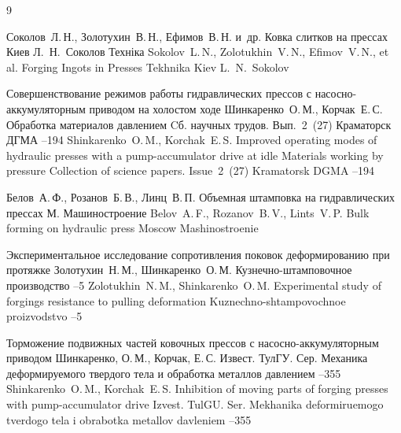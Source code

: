 \begin{thebibliography}{9}

\by Соколов~Л.\,Н., Золотухин~В.\,Н., Ефимов~В.\,Н. и~др.
\book Ковка слитков на прессах
\publaddr Киев
\ed Л.~Н.~Соколов
\publ Техніка
\misctransl 
\by Sokolov~L.\,N., Zolotukhin~V.\,N., Efimov~V.\,N., et al.
\book Forging Ingots in Presses 
\publ Tekhnika
\publaddr Kiev 
\ed L.~N.~Sokolov

\paper Совершенствование режимов работы гидравлических прессов с насосно-аккумуляторным приводом на холостом ходе
\by Шинкаренко~О.\,М., Корчак~Е.\,С.
\inbook Обработка материалов давлением
\bookinfo Cб. научных трудов. Вып.~2~(27)
\publaddr Краматорск
\publ ДГМА
--194
\misctransl
\by Shinkarenko~O.\,M., Korchak~E.\,S.
\paper Improved operating modes of hydraulic presses with a pump-accumulator drive at idle 
\inbook Materials working by pressure
\bookinfo Collection of science papers. Issue~2~(27)
\publaddr Kramatorsk 
\publ DGMA
--194



\by Белов~А.\,Ф., Розанов~Б.\,В., Линц~В.\,П.
\book Объемная штамповка на гидравлических прессах
\publaddr М.
\publ Машиностроение
\misctransl
\by Belov~A.\,F., Rozanov~B.\,V., Lints~V.\,P.
\book Bulk forming on hydraulic press
\publaddr Moscow
\publ Mashinostroenie


\paper Экспериментальное исследование сопротивления поковок деформированию при протяжке
\by Золотухин~Н.\,М., Шинкаренко~О.\,М.
\jour Кузнечно-штамповочное производство
--5
\misctransl
\by Zolotukhin~N.\,M., Shinkarenko~O.\,M.
\paper Experimental study of forgings resistance to pulling deformation
\jour Kuznechno-shtampovochnoe proizvodstvo
--5

\paper Торможение подвижных частей ковочных прессов с насосно-аккумуляторным приводом
\by Шинкаренко, О.\,М., Корчак, Е.\,С.
\jour Извест. ТулГУ. Сер. Механика деформируемого твердого тела и обработка металлов давлением
--355
\misctransl
\by Shinkarenko~O.\,M., Korchak~E.\,S.
\paper Inhibition of moving parts of forging presses with pump-accumulator drive
\jour Izvest. TulGU. Ser. Mekhanika deformiruemogo tverdogo tela i obrabotka metallov davleniem
--355




\end{thebibliography}

\noindent
\hskip6.5cm \thedate \par\noindent
\hskip6.5cm\therevdate




\makeengtitle

\newpage

%
%
